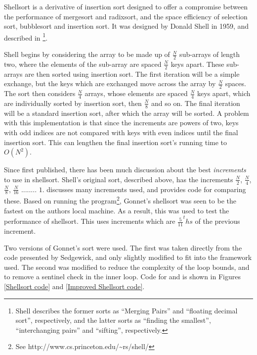 \label{shell}

Shellsort is a derivative of insertion sort designed to offer a compromise
between the performance of mergesort and radixsort, and the space efficiency of
selection sort, bubblesort and insertion sort. It was designed by Donald Shell
in 1959, and described in \cite{Shell59}\footnote{Shell describes the former
sorts as ``Merging Pairs'' and ``floating decimal sort'', respectively, and the
latter sorts as ``finding the smallest'', ``interchanging pairs'' and ``sifting'',
respectively.}.

Shell begins by considering the array to be made up of $\frac{N}{2}$ sub-arrays
of length two, where the elements of the sub-array are spaced $\frac{N}{2}$ keys
apart.  These sub-arrays are then sorted using insertion sort. The first
iteration will be a simple exchange, but the keys which are exchanged move
across the array by $\frac{N}{2}$ spaces. The sort then considers $\frac{N}{4}$
arrays, whose elements are spaced $\frac{N}{4}$ keys apart, which are
individually sorted by insertion sort, then $\frac{N}{8}$ and so on. The final
iteration will be a standard insertion sort, after which the array will be
sorted. A problem with this implementation is that since the increments are
powers of two, keys with odd indices are not compared with keys with even
indices until the final insertion sort. This can lengthen the final insertion
sort's running time to $O(N^2)$.

Since first published, there has been much discussion about the best
\textit{increments} to use in shellsort. Shell's original sort, described above,
has the increments $\frac{N}{2}$, $\frac{N}{4}$, $\frac{N}{8}$, $\frac{N}{16}$
........ $1$. \cite{Sedgewick96} discusses many increments used, and provides
code for comparing these. Based on running the  program\footnote{See
http://www.cs.princeton.edu/\textasciitilde{}rs/shell/}, Gonnet's shellsort was
seen to be the fastest on the authors local machine. As a result, this was used
to test the performance of shellsort. This uses increments which are
$\frac{5}{11}^ths$ of the previous increment.

Two versions of Gonnet's sort were used. The first was taken directly from the
code presented by Sedgewick, and only slightly modified to fit into the
framework used.  The second was modified to reduce the complexity of the loop
bounds, and to remove a sentinel check in the inner loop. Code for
 and  is shown in Figures \ref{Shellsort
code} and \ref{Improved Shellsort code}.

